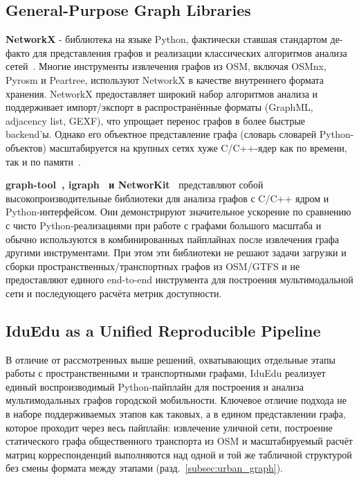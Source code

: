 \documentclass[sigconf,nonacm]{acmart}
\begin{document}
    \subsection{General-Purpose Graph Libraries}
    \label{subsec:general-purpose-graph-libraries}

    \textbf{NetworkX} - библиотека на языке Python, фактически ставшая стандартом де-факто для представления графов и
    реализации классических алгоритмов анализа сетей~\cite{hagberg2008networkx}.
    Многие инструменты извлечения графов из OSM, включая OSMnx, Pyrosm и Peartree, используют NetworkX в качестве
    внутреннего формата хранения.
    NetworkX предоставляет широкий набор алгоритмов анализа и поддерживает импорт/экспорт в распространённые форматы
    (GraphML, adjacency list, GEXF), что упрощает перенос графов в более быстрые backend'ы.
    Однако его объектное представление графа (словарь словарей Python-объектов) масштабируется на крупных сетях хуже
    C/C++-ядер как по времени, так и по памяти~\cite{staudt2016networkit, benchmark_graphtools}.


    \textbf{graph-tool~\cite{graphtool_docs}, igraph~\cite{csardi2006igraph} и NetworKit~\cite{staudt2016networkit}}
    представляют собой высокопроизводительные библиотеки для анализа графов с C/C++ ядром и Python-интерфейсом.
    Они демонстрируют значительное ускорение по сравнению с чисто Python-реализациями при работе с графами большого
    масштаба и обычно используются в комбинированных пайплайнах после извлечения графа другими инструментами.
    При этом эти библиотеки не решают задачи загрузки и сборки пространственных/транспортных графов из OSM/GTFS и не
    предоставляют единого end-to-end инструмента для построения мультимодальной сети и последующего расчёта метрик доступности.

    \subsection{IduEdu as a Unified Reproducible Pipeline}
    \label{subsec:iduedu-as-a-unified-reproducible-pipeline}

    В отличие от рассмотренных выше решений, охватывающих отдельные этапы работы с пространственными и транспортными графами,
    IduEdu реализует единый воспроизводимый Python-пайплайн для построения и анализа мультимодальных графов городской мобильности.
    Ключевое отличие подхода не в наборе поддерживаемых этапов как таковых, а в едином представлении графа, которое проходит через весь пайплайн:
    извлечение уличной сети, построение статического графа общественного транспорта из OSM и масштабируемый расчёт матриц корреспонденций
    выполняются над одной и той же табличной структурой без смены формата между этапами (разд.~\ref{subsec:urban_graph}).
\end{document}
